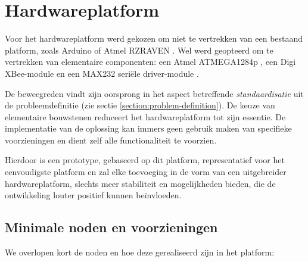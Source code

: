
\chapter{Hardwareplatform}
\label{hardware-platform}

Voor het hardwareplatform werd gekozen om niet te vertrekken van een bestaand
platform, zoals Arduino \citep{url:arduino} of Atmel RZRAVEN
\citep{manual:rzraven}. Wel werd geopteerd om te vertrekken van elementaire
componenten: een Atmel ATMEGA1284p \mcu \citep{datasheet:atmega1284p}, een Digi
XBee-module \citep{manual:xbee} en een MAX232 seri\"ele driver-module
\citep{datasheet:max232}.

De beweegreden vindt zijn oorsprong in het aspect betreffende
\emph{standaardisatie} uit de probleemdefinitie (zie sectie
\ref{section:problem-definition}). De keuze van elementaire bouwstenen
reduceert het hardwareplatform tot zijn essentie. De implementatie van de
oplossing kan immers geen gebruik maken van specifieke voorzieningen en dient
zelf alle functionaliteit te voorzien.

Hierdoor is een prototype, gebaseerd op dit platform, representatief voor het
eenvoudigste platform en zal elke toevoeging in de vorm van een uitgebreider
hardwareplatform, slechts meer stabiliteit en mogelijkheden bieden, die de
ontwikkeling louter positief kunnen be\"invloeden.

\section{Minimale noden en voorzieningen}

We overlopen kort de noden en hoe deze gerealiseerd zijn in het platform:

